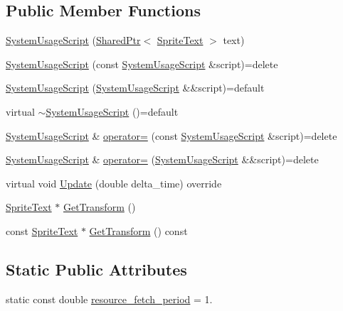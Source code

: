 \subsection*{Public Member Functions}
\begin{DoxyCompactItemize}
\item 
\hyperlink{classmage_1_1_system_usage_script_a430d87647bdc6e407838863b1fcb750d}{System\+Usage\+Script} (\hyperlink{namespacemage_a1e01ae66713838a7a67d30e44c67703e}{Shared\+Ptr}$<$ \hyperlink{classmage_1_1_sprite_text}{Sprite\+Text} $>$ text)
\item 
\hyperlink{classmage_1_1_system_usage_script_a3fccc6dda27ede785fb9c45360e53bb0}{System\+Usage\+Script} (const \hyperlink{classmage_1_1_system_usage_script}{System\+Usage\+Script} \&script)=delete
\item 
\hyperlink{classmage_1_1_system_usage_script_adbaefc6bb87c29d6bdd52e23181e0735}{System\+Usage\+Script} (\hyperlink{classmage_1_1_system_usage_script}{System\+Usage\+Script} \&\&script)=default
\item 
virtual \hyperlink{classmage_1_1_system_usage_script_adbe04339a1c3dba450634009c30601bb}{$\sim$\+System\+Usage\+Script} ()=default
\item 
\hyperlink{classmage_1_1_system_usage_script}{System\+Usage\+Script} \& \hyperlink{classmage_1_1_system_usage_script_a3ca814599a30991f3e6068cec2b876df}{operator=} (const \hyperlink{classmage_1_1_system_usage_script}{System\+Usage\+Script} \&script)=delete
\item 
\hyperlink{classmage_1_1_system_usage_script}{System\+Usage\+Script} \& \hyperlink{classmage_1_1_system_usage_script_ad9c1a2f19c6d79adbd32789e479e1427}{operator=} (\hyperlink{classmage_1_1_system_usage_script}{System\+Usage\+Script} \&\&script)=delete
\item 
virtual void \hyperlink{classmage_1_1_system_usage_script_af7189c6e81dabfe077710ed9f3c7cd09}{Update} (double delta\+\_\+time) override
\item 
\hyperlink{classmage_1_1_sprite_text}{Sprite\+Text} $\ast$ \hyperlink{classmage_1_1_system_usage_script_ad8291c309495bd06cd6878814bc422c9}{Get\+Transform} ()
\item 
const \hyperlink{classmage_1_1_sprite_text}{Sprite\+Text} $\ast$ \hyperlink{classmage_1_1_system_usage_script_ac6f33a63937537375821d7780859a83e}{Get\+Transform} () const
\end{DoxyCompactItemize}
\subsection*{Static Public Attributes}
\begin{DoxyCompactItemize}
\item 
static const double \hyperlink{classmage_1_1_system_usage_script_a98a30b1da6b9b87237e3509aed961162}{resource\+\_\+fetch\+\_\+period} = 1.
\end{DoxyCompactItemize}
